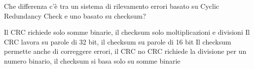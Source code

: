 \question
Che differenza c'è tra un sistema di rilevamento errori basato su Cyclic Redundancy Check e uno basato su checksum?

\begin{checkboxes}
	\choice Il CRC richiede solo somme binarie, il checksum solo moltiplicazioni e divisioni
	\choice Il CRC lavora su parole di 32 bit, il checksum su parole di 16 bit
	\choice Il checksum permette anche di correggere errori, il CRC no
	\CorrectChoice CRC richiede la divisione per un numero binario, il checksum si basa solo su somme binarie
\end{checkboxes}

